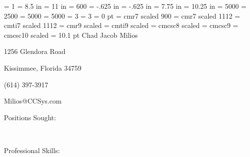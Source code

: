 \pdfoutput = 1
\pdfpagewidth = 8.5 in
\pdfpageheight = 11 in
\pdfpkresolution = 600
\hoffset = -.625 in%
\voffset = -.625 in%
\hsize = 7.75 in%
\vsize = 10.25 in%
\nopagenumbers%
\tolerance = 5000%
\hbadness = 2500%
\hyphenpenalty = 5000%
\exhyphenpenalty = 5000%
\lefthyphenmin = 3%
\righthyphenmin = 3%
\parindent = 0 pt%
\font\myfp = cmr7 scaled 900%
\font\myrm = cmr7 scaled 1112%
\font\myit = cmti7 scaled 1112%
\font\mybigrm = cmr9 scaled \magstephalf%
\font\mybigit = cmti9 scaled \magstephalf%
\font\mylilcsc = cmcsc8 scaled \magstephalf%
\font\mycsc = cmcsc9%
\font\mybigcsc = cmcsc10 scaled %
\baselineskip = 10.1 pt
{%
	\mybigcsc%
	\hfil%
	Chad Jacob Milios%
	\hfil%
}%
\smallskip%
{%
	\mycsc%
	\hfil%
	1256 Glendora Road%
	\hfil%
	\par%
	\hfil%
	Kissimmee, Florida 34759%
	\hfil%
	\par%
	\hfil%
	(614) 397-3917%
	\hfil%
	\par%
	\hfil%
	Milios@CCSys.com%
	\hfil%
}%
\bigskip%
{%
	\mycsc%
	Positions Sought:%
	\hfil%
	\par%
}%
\medskip%
\hbox{%
	\vtop{%
		\hsize = .125 in%
		\hfil%
	}%
}%
\bigskip%
{%
	\mycsc%
	Professional Skills:%
	\hfil%
	\par%
}%
\medskip%
